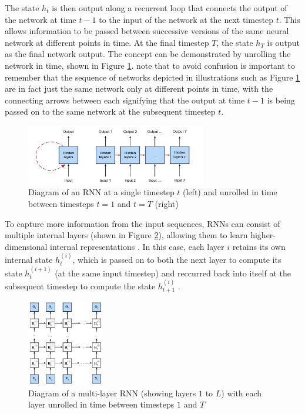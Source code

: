 \documentclass[a4paper, 11pt]{report}
\begin{document}
    The state $h_t$ is then output along a recurrent loop that connects the output of the network at time $t-1$ to the input of the network at the next timestep $t$. This allows information to be passed between successive versions of the same neural network at different points in time. At the final timestep $T$, the state $h_T$ is output as the final network output. The concept can be demonstrated by unrolling the network in time, shown in Figure \ref{fig: rnn-diagram}. \citet{tsantekidis-2022} note that to avoid confusion is important to remember that the sequence of networks depicted in illustrations such as Figure \ref{fig: rnn-diagram} are in fact just the same network only at different points in time, with the connecting arrows between each signifying that the output at time $t-1$ is being passed on to the same network at the subsequent timestep $t$.

    \begin{figure}[ht]
        \centering
        \includegraphics[width=0.7\textwidth]{rnn.png}
        \caption{\centering Diagram of an RNN at a single timestep $t$ (left) and unrolled in time between timesteps $t=1$ and $t=T$ (right) \citep{zhang-2021}}
        \label{fig: rnn-diagram}
    \end{figure}

    To capture more information from the input sequences, RNNs can consist of multiple internal layers (shown in Figure \ref{fig: deep-rnn}), allowing them to learn higher-dimensional internal representations \citep{bengio-2009}. In this case, each layer $i$ retains its own internal state $h^{(i)}_t$, which is passed on to both the next layer to compute its state $h^{(i+1)}_t$ (at the same input timestep) and reccurred back into itself at the subsequent timestep to compute the state $h^{(i)}_{t+1}$ \citep{zhang-2021}. 

    \begin{figure}[ht]
        \centering
        \includegraphics[width=0.3\textwidth]{deep-rnn.png}
        \caption{\centering Diagram of a multi-layer RNN (showing layers $1$ to $L$) with each layer unrolled in time between timesteps $1$ and $T$ \citep{zhang-2021}}
        \label{fig: deep-rnn}
    \end{figure}
\end{document}
